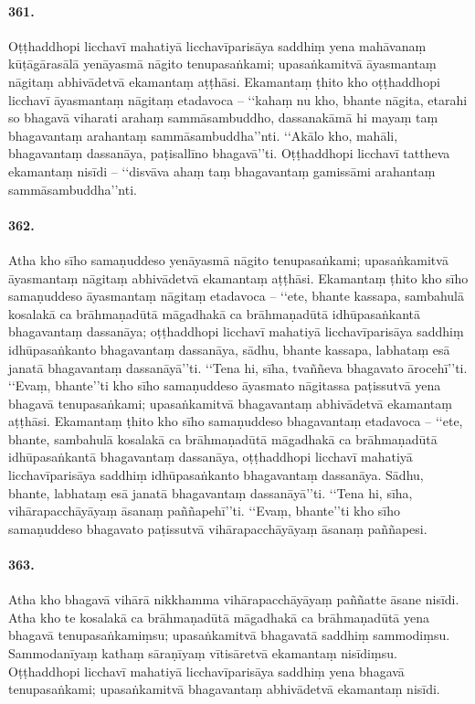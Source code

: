 \paragraph{361.} Oṭṭhaddhopi licchavī mahatiyā licchavīparisāya saddhiṃ yena mahāvanaṃ kūṭāgārasālā yenāyasmā nāgito tenupasaṅkami; upasaṅkamitvā āyasmantaṃ nāgitaṃ abhivādetvā ekamantaṃ aṭṭhāsi. Ekamantaṃ ṭhito kho oṭṭhaddhopi licchavī āyasmantaṃ nāgitaṃ etadavoca – ‘‘kahaṃ nu kho, bhante nāgita, etarahi so bhagavā viharati arahaṃ sammāsambuddho, dassanakāmā hi mayaṃ taṃ bhagavantaṃ arahantaṃ sammāsambuddha’’nti. ‘‘Akālo kho, mahāli, bhagavantaṃ dassanāya, paṭisallīno bhagavā’’ti. Oṭṭhaddhopi licchavī tattheva ekamantaṃ nisīdi – ‘‘disvāva ahaṃ taṃ bhagavantaṃ gamissāmi arahantaṃ sammāsambuddha’’nti.

\paragraph{362.} Atha kho sīho samaṇuddeso yenāyasmā nāgito tenupasaṅkami; upasaṅkamitvā āyasmantaṃ nāgitaṃ abhivādetvā ekamantaṃ aṭṭhāsi. Ekamantaṃ ṭhito kho sīho samaṇuddeso āyasmantaṃ nāgitaṃ etadavoca – ‘‘ete, bhante kassapa, sambahulā kosalakā ca brāhmaṇadūtā māgadhakā ca brāhmaṇadūtā idhūpasaṅkantā bhagavantaṃ dassanāya; oṭṭhaddhopi licchavī mahatiyā licchavīparisāya saddhiṃ idhūpasaṅkanto bhagavantaṃ dassanāya, sādhu, bhante kassapa, labhataṃ esā janatā bhagavantaṃ dassanāyā’’ti. ‘‘Tena hi, sīha, tvaññeva bhagavato ārocehī’’ti. ‘‘Evaṃ, bhante’’ti kho sīho samaṇuddeso āyasmato nāgitassa paṭissutvā yena bhagavā tenupasaṅkami; upasaṅkamitvā bhagavantaṃ abhivādetvā ekamantaṃ aṭṭhāsi. Ekamantaṃ ṭhito kho sīho samaṇuddeso bhagavantaṃ etadavoca – ‘‘ete, bhante, sambahulā kosalakā ca brāhmaṇadūtā māgadhakā ca brāhmaṇadūtā idhūpasaṅkantā bhagavantaṃ dassanāya, oṭṭhaddhopi licchavī mahatiyā licchavīparisāya saddhiṃ idhūpasaṅkanto bhagavantaṃ dassanāya. Sādhu, bhante, labhataṃ esā janatā bhagavantaṃ dassanāyā’’ti. ‘‘Tena hi, sīha, vihārapacchāyāyaṃ āsanaṃ paññapehī’’ti. ‘‘Evaṃ, bhante’’ti kho sīho samaṇuddeso bhagavato paṭissutvā vihārapacchāyāyaṃ āsanaṃ paññapesi.

\paragraph{363.} Atha kho bhagavā vihārā nikkhamma vihārapacchāyāyaṃ paññatte āsane nisīdi. Atha kho te kosalakā ca brāhmaṇadūtā māgadhakā ca brāhmaṇadūtā yena bhagavā tenupasaṅkamiṃsu; upasaṅkamitvā bhagavatā saddhiṃ sammodiṃsu. Sammodanīyaṃ kathaṃ sāraṇīyaṃ vītisāretvā ekamantaṃ nisīdiṃsu. Oṭṭhaddhopi licchavī mahatiyā licchavīparisāya saddhiṃ yena bhagavā tenupasaṅkami; upasaṅkamitvā bhagavantaṃ abhivādetvā ekamantaṃ nisīdi.

